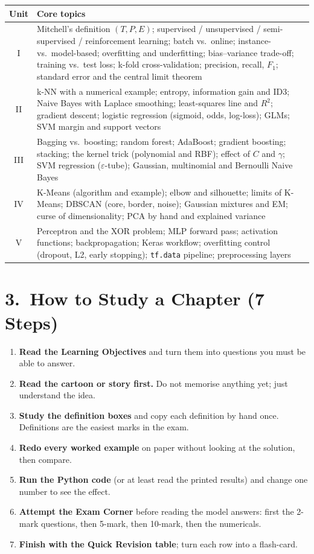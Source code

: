 \begin{center}
\small
\begin{tabular}{@{}cp{13.2cm}@{}}
\toprule
\textbf{Unit} & \textbf{Core topics}\\
\midrule
I & Mitchell's definition $(T,P,E)$; supervised / unsupervised / semi-supervised / reinforcement learning; batch vs.\ online; instance- vs.\ model-based; overfitting and underfitting; bias--variance trade-off; training vs.\ test loss; k-fold cross-validation; precision, recall, $F_1$; standard error and the central limit theorem\\
II & k-NN with a numerical example; entropy, information gain and ID3; Naive Bayes with Laplace smoothing; least-squares line and $R^2$; gradient descent; logistic regression (sigmoid, odds, log-loss); GLMs; SVM margin and support vectors\\
III & Bagging vs.\ boosting; random forest; AdaBoost; gradient boosting; stacking; the kernel trick (polynomial and RBF); effect of $C$ and $\gamma$; SVM regression ($\varepsilon$-tube); Gaussian, multinomial and Bernoulli Naive Bayes\\
IV & K-Means (algorithm and example); elbow and silhouette; limits of K-Means; DBSCAN (core, border, noise); Gaussian mixtures and EM; curse of dimensionality; PCA by hand and explained variance\\
V & Perceptron and the XOR problem; MLP forward pass; activation functions; backpropagation; Keras workflow; overfitting control (dropout, L2, early stopping); \texttt{tf.data} pipeline; preprocessing layers\\
\bottomrule
\end{tabular}
\end{center}

\section*{3.\ How to Study a Chapter (7 Steps)}

\begin{enumerate}
  \item \textbf{Read the Learning Objectives} and turn them into questions you must be able to answer.
  \item \textbf{Read the cartoon or story first.} Do not memorise anything yet; just understand the idea.
  \item \textbf{Study the definition boxes} and copy each definition by hand once. Definitions are the easiest marks in the exam.
  \item \textbf{Redo every worked example} on paper without looking at the solution, then compare.
  \item \textbf{Run the Python code} (or at least read the printed results) and change one number to see the effect.
  \item \textbf{Attempt the Exam Corner} before reading the model answers: first the 2-mark questions, then 5-mark, then 10-mark, then the numericals.
  \item \textbf{Finish with the Quick Revision table}; turn each row into a flash-card.
\end{enumerate}

